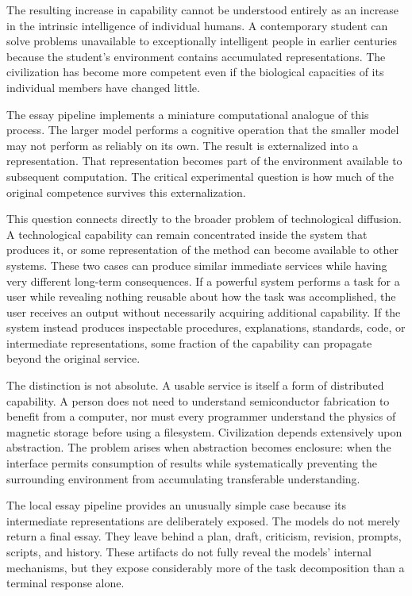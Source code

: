 \documentclass[11pt]{article}
\begin{document}
The resulting increase in capability cannot be understood entirely as an increase in the intrinsic intelligence of individual humans. A contemporary student can solve problems unavailable to exceptionally intelligent people in earlier centuries because the student's environment contains accumulated representations. The civilization has become more competent even if the biological capacities of its individual members have changed little.

The essay pipeline implements a miniature computational analogue of this process. The larger model performs a cognitive operation that the smaller model may not perform as reliably on its own. The result is externalized into a representation. That representation becomes part of the environment available to subsequent computation. The critical experimental question is how much of the original competence survives this externalization.

This question connects directly to the broader problem of technological diffusion. A technological capability can remain concentrated inside the system that produces it, or some representation of the method can become available to other systems. These two cases can produce similar immediate services while having very different long-term consequences. If a powerful system performs a task for a user while revealing nothing reusable about how the task was accomplished, the user receives an output without necessarily acquiring additional capability. If the system instead produces inspectable procedures, explanations, standards, code, or intermediate representations, some fraction of the capability can propagate beyond the original service.

The distinction is not absolute. A usable service is itself a form of distributed capability. A person does not need to understand semiconductor fabrication to benefit from a computer, nor must every programmer understand the physics of magnetic storage before using a filesystem. Civilization depends extensively upon abstraction. The problem arises when abstraction becomes enclosure: when the interface permits consumption of results while systematically preventing the surrounding environment from accumulating transferable understanding.

The local essay pipeline provides an unusually simple case because its intermediate representations are deliberately exposed. The models do not merely return a final essay. They leave behind a plan, draft, criticism, revision, prompts, scripts, and history. These artifacts do not fully reveal the models' internal mechanisms, but they expose considerably more of the task decomposition than a terminal response alone.
\end{document}
